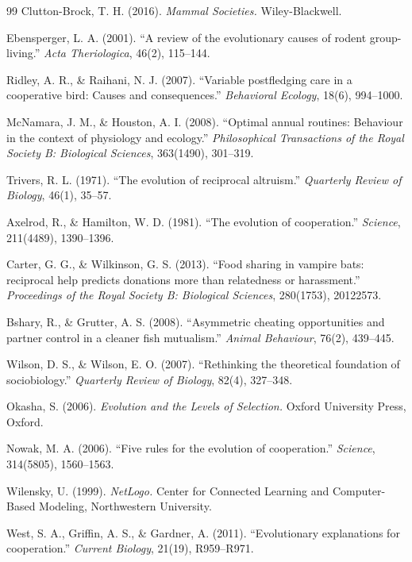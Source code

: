 \begin{thebibliography}{99}
Clutton-Brock, T. H. (2016).
\textit{Mammal Societies.}
Wiley-Blackwell.

Ebensperger, L. A. (2001).
``A review of the evolutionary causes of rodent group-living.''
\textit{Acta Theriologica}, 46(2), 115–144.

Ridley, A. R., \& Raihani, N. J. (2007).
``Variable postfledging care in a cooperative bird: Causes and consequences.''
\textit{Behavioral Ecology}, 18(6), 994–1000.

McNamara, J. M., \& Houston, A. I. (2008).
``Optimal annual routines: Behaviour in the context of physiology and ecology.''
\textit{Philosophical Transactions of the Royal Society B: Biological Sciences}, 363(1490), 301–319.

Trivers, R. L. (1971).
``The evolution of reciprocal altruism.''
\textit{Quarterly Review of Biology}, 46(1), 35–57.

Axelrod, R., \& Hamilton, W. D. (1981).
``The evolution of cooperation.''
\textit{Science}, 211(4489), 1390–1396.

Carter, G. G., \& Wilkinson, G. S. (2013).
``Food sharing in vampire bats: reciprocal help predicts donations more than relatedness or harassment.''
\textit{Proceedings of the Royal Society B: Biological Sciences}, 280(1753), 20122573.

Bshary, R., \& Grutter, A. S. (2008).
``Asymmetric cheating opportunities and partner control in a cleaner fish mutualism.''
\textit{Animal Behaviour}, 76(2), 439–445.

Wilson, D. S., \& Wilson, E. O. (2007).
``Rethinking the theoretical foundation of sociobiology.''
\textit{Quarterly Review of Biology}, 82(4), 327–348.

Okasha, S. (2006).
\textit{Evolution and the Levels of Selection.}
Oxford University Press, Oxford.

Nowak, M. A. (2006).
``Five rules for the evolution of cooperation.''
\textit{Science}, 314(5805), 1560–1563.

Wilensky, U. (1999).
\textit{NetLogo.} Center for Connected Learning and Computer-Based Modeling, Northwestern University.

West, S. A., Griffin, A. S., \& Gardner, A. (2011).
``Evolutionary explanations for cooperation.''
\textit{Current Biology}, 21(19), R959–R971.


\end{thebibliography}
